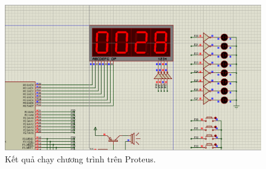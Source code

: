 \documentclass[../report.tex]{subfiles}
\begin{document}
\begin{figure}[H]
    \centering
    \includegraphics[width=\textwidth]{figures/result.png}
    \caption{Kết quả chạy chương trình trên Proteus.}
\end{figure}
\end{document}
